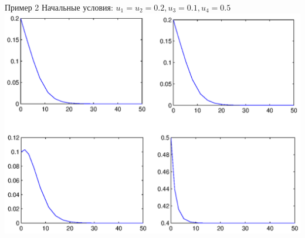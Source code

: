 \documentclass{beamer}
\begin{document}
\begin{frame}{Пример 2}
Начальные условия:
$u_1 = u_2 = 0.2, u_3 = 0.1, u_4 = 0.5$
\includegraphics[scale=0.5]{pics/br2.eps}
\end{frame}
\end{document}
